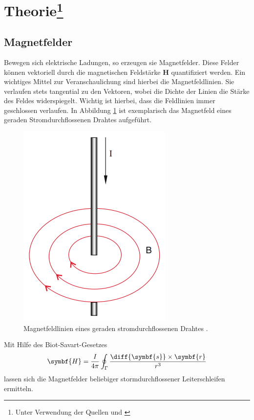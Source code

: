 \section[Theorie]{Theorie\footnote{Unter Verwendung der Quellen \cite[]{man:v308} und \cite[]{demtroeder2}}}

\subsection{Magnetfelder}
Bewegen sich elektrische Ladungen, so erzeugen sie Magnetfelder.
Diese Felder können vektoriell durch die magnetischen Feldstärke $\symbf{H}$ quantifiziert werden.
Ein wichtiges Mittel zur Veranschaulichung sind hierbei die Magnetfeldlinien.
Sie verlaufen stets tangential zu den Vektoren, wobei die Dichte der Linien die Stärke des Feldes widerspiegelt.
Wichtig ist hierbei, dass die Feldlinien immer geschlossen verlaufen.
In Abbildung \ref{fig:ger_stromdurchfl_draht} ist exemplarisch das Magnetfeld eines geraden Stromdurchflossenen Drahtes aufgeführt.
\begin{figure}[H]
    \centering
    \includegraphics*[]{./abbildungen/stromdurchfl_gerader_draht.png}
    \caption[]{Magnetfeldlinien eines geraden stromdurchflossenen Drahtes \cite[S. 86]{demtroeder2}.}
    \label{fig:ger_stromdurchfl_draht}
\end{figure}
%
\noindent
Mit Hilfe des Biot-Savart-Gesetzes 
\begin{align}
    \symbf{H} = \frac{I}{4 \pi} \oint_\Gamma \frac{\diff{\symbf{s}} \times \symbf{r}}{r^3}
\end{align}
lassen sich die Magnetfelder beliebiger stormdurchflossener Leiterschleifen \Gamma ermitteln.
